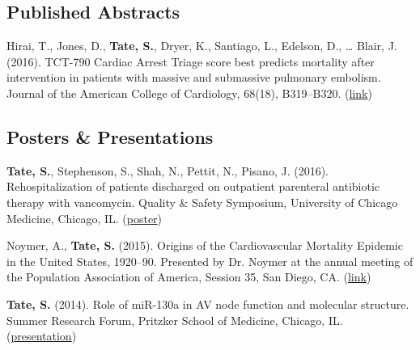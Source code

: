 \documentclass[letterpaper]{article}
\renewenvironment{itemize}{
  \begin{list}{}{
    \setlength{\leftmargin}{0.3cm}
    \setlength{\rightmargin}{0.3cm}
    \setlength{\parskip}{0cm}
  }
}{
  \end{list}}
\begin{document}
\subsection*{Published Abstracts}

\begin{itemize}
\item Hirai, T., Jones, D., {\bf Tate, S.}, Dryer, K., Santiago, L., Edelson, D., … Blair, J. (2016). TCT-790 Cardiac Arrest Triage score best predicts mortality after intervention in patients with massive and submassive pulmonary embolism. Journal of the American College of Cardiology, 68(18), B319–B320. (\href{https://doi.org/10.1016/j.jacc.2016.09.821}{link})
\end{itemize}

\subsection*{Posters \& Presentations}

\begin{itemize}

\item {\bf Tate, S.}, Stephenson, S., Shah, N., Pettit, N., Pisano, J. (2016). Rehospitalization of patients discharged on outpatient parenteral antibiotic therapy with vancomycin. Quality \& Safety Symposium, University of Chicago Medicine, Chicago, IL. (\href{https://dl.dropboxusercontent.com/u/73608618/shared/srp.pdf}{poster})

\item Noymer, A., {\bf Tate, S.} (2015). Origins of the Cardiovascular Mortality Epidemic in the United States, 1920--90. Presented by Dr. Noymer at the annual meeting of the Population Association of America, Session 35, San Diego, CA. (\href{http://paa2015.princeton.edu/abstracts/151138}{link})

\item {\bf Tate, S.} (2014). Role of miR-130a in AV node function and molecular structure. Summer Research Forum, Pritzker School of Medicine, Chicago, IL. (\href{https://dl.dropboxusercontent.com/u/73608618/shared/opat.pdf}{presentation})

\end{itemize}
\end{document}
